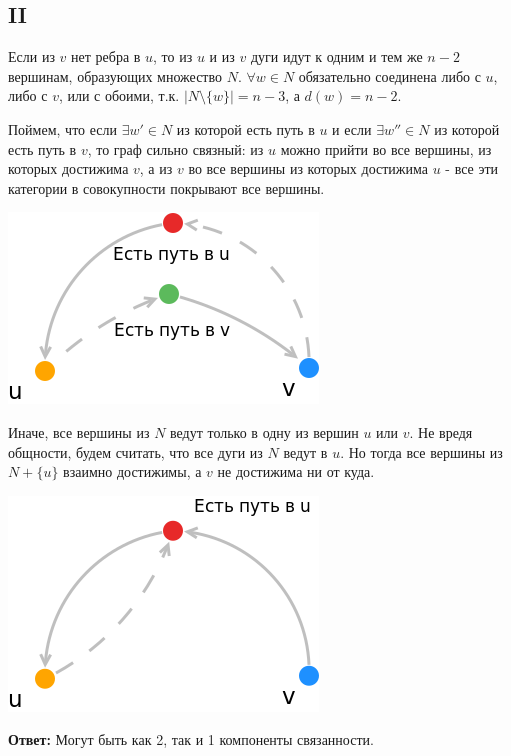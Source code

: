 \documentclass{article}
\begin{document}
	\subsection{II}
	
	Если из $v$ нет ребра в $u$, то из $u$ и из $v$ дуги идут к одним и тем же $n - 2$ вершинам, образующих множество $N$. $\forall w \in N$ обязательно соединена либо с $u$, либо с $v$, или с обоими, т.к. $|N \setminus \{w\}| = n - 3$, а $d(w) = n - 2$.
	
	Поймем, что если $\exists w' \in N $ из которой есть путь в $u$ и если $\exists w'' \in N $ из которой есть путь в $v$, то граф сильно связный: из $u$ можно прийти во все вершины, из которых достижима $v$, а из $v$ во все вершины из которых достижима $u$ - все эти категории в совокупности покрывают все вершины. 
	
		\begin{center}
			\includegraphics[scale=0.5]{8_3}
		\end{center}	
	
	Иначе, все вершины из $N$ ведут только в одну из вершин $u$ или $v$. Не вредя общности, будем считать, что все дуги из $N$ ведут в $u$. Но тогда все вершины из $N + \{u\}$ взаимно достижимы, а $v$ не достижима ни от куда.
		\begin{center}
			\includegraphics[scale=0.5]{8_4}
		\end{center}
	
	\textbf{Ответ:} Могут быть как 2, так и 1 компоненты связанности.
	 
	
\end{document}
